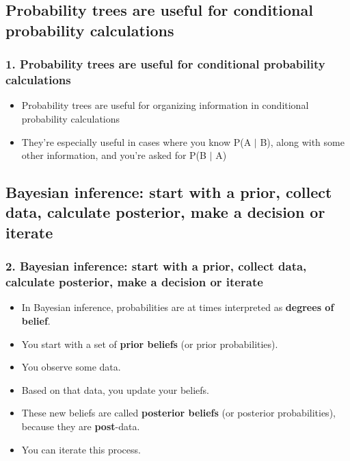 \documentclass[slidestop,compress,mathserif,11pt,t,professionalfonts,xcolor=table]{beamer}
\begin{document}
\subsection{Probability trees are useful for conditional probability calculations}
\label{mi1}


\begin{frame}
\frametitle{1. Probability trees are useful for conditional probability calculations}

\begin{itemize}

\item Probability trees are useful for organizing information in conditional probability calculations

\item They're especially useful in cases where you know P(A $|$ B), along with some other information, and you're asked for P(B $|$ A)

\end{itemize}

\end{frame}


\subsection{Bayesian inference: start with a prior, collect data, calculate posterior, make a decision or iterate}
\label{mi2}


\begin{frame}
\frametitle{2. Bayesian inference: start with a prior, collect data, calculate posterior, make a decision or iterate}

\begin{itemize}[<+->]

\item In Bayesian inference, probabilities are at times interpreted as \textbf{degrees of belief}.

\item You start with a set of \textbf{prior beliefs} (or prior probabilities).

\item You observe some data.

\item Based on that data, you update your beliefs.  

\item These new beliefs are called \textbf{posterior beliefs} (or posterior probabilities), because they are \textbf{post}-data.

\item You can iterate this process.

\end{itemize}

\end{frame}
\end{document}
